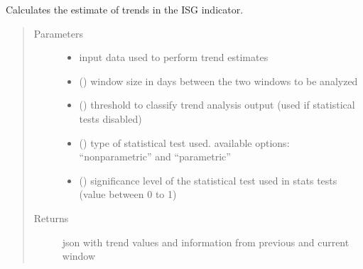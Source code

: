 \documentclass[letterpaper,10pt,english]{sphinxmanual}
\begin{document}

\begin{fulllineitems}
\label{\detokenize{algorithms:algorithms.eti.eti.calc_eti_isg}}
\sphinxAtStartPar
Calculates the estimate of trends in the ISG indicator.
\begin{quote}\begin{description}
\item[{Parameters}] \leavevmode\begin{itemize}
\item {} 
\sphinxAtStartPar
{} \textendash{} input data used to perform trend estimates

\item {} 
\sphinxAtStartPar
{} () \textendash{} window size in days between the two windows to be analyzed

\item {} 
\sphinxAtStartPar
{} () \textendash{} threshold to classify trend analysis output (used if statistical tests disabled)

\item {} 
\sphinxAtStartPar
{} () \textendash{} type of statistical test used. available options: “nonparametric” and “parametric”

\item {} 
\sphinxAtStartPar
{} () \textendash{} significance level of the statistical test used in stats tests (value between 0 to 1)

\end{itemize}

\item[{Returns}] \leavevmode
\sphinxAtStartPar
json with trend values and information from previous and current window

\end{description}\end{quote}

\end{fulllineitems}
\end{document}

